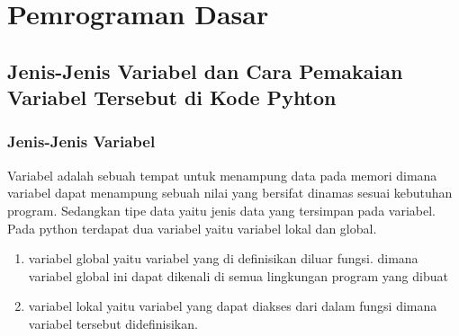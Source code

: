 \chapter{Pemrograman Dasar}
\section {Jenis-Jenis Variabel dan Cara Pemakaian Variabel Tersebut di Kode Pyhton}
\subsection{Jenis-Jenis Variabel}
Variabel adalah sebuah tempat untuk menampung data pada memori dimana variabel dapat menampung sebuah nilai yang bersifat dinamas sesuai kebutuhan program. Sedangkan tipe data yaitu jenis data yang tersimpan pada variabel. Pada python terdapat dua variabel yaitu variabel lokal dan global.
\begin{enumerate}
    \item variabel global yaitu variabel yang di definisikan diluar fungsi. dimana variabel global ini dapat dikenali di semua lingkungan program yang dibuat
    \item variabel lokal yaitu variabel yang dapat diakses dari dalam fungsi dimana variabel tersebut didefinisikan.
\end{enumerate}
